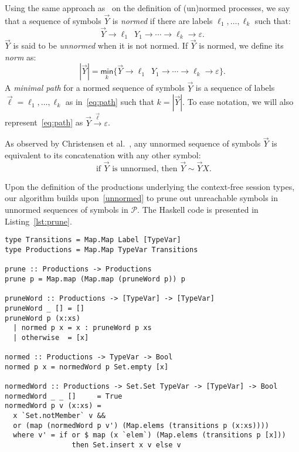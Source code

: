 Using the same approach as~\cite{DBLP:journals/iandc/ChristensenHS95} on 
the definition of (un)normed processes, we say that a sequence of symbols 
$\vec Y$ is \emph{normed} if there are labels $\ell_1,\ldots, \ell_k$ 
such that:
\begin{equation}
\label{eq:path}
	\vec Y \rightarrow \ell_1\enspace Y_1 \rightarrow \cdots \rightarrow \ell_k 
	\rightarrow \varepsilon.
\end{equation}
$\vec Y$ is said to be \emph{unnormed} when it is not normed. If $\vec Y$ 
is normed, we define its \emph{norm} as: 
\[ | \vec Y | = \underset{k}{\mathsf{min}} \{\vec Y \rightarrow \ell_1\enspace Y_1 
\rightarrow \cdots \rightarrow \ell_k \rightarrow \varepsilon \}.\]
A \emph{minimal path} for a normed sequence of symbols $\vec Y$ is a sequence of
labels $\vec \ell = \ell_1,\ldots,\ell_k$ as in~\eqref{eq:path} such that 
$k = | \vec Y |$. To ease notation, we will also represent~\eqref{eq:path} as
$\vec Y \xrightarrow{\vec \ell} \varepsilon$.


As observed by Christensen et al.~\cite{DBLP:journals/iandc/ChristensenHS95}, 
any unnormed sequence of symbols $\vec Y$ is equivalent to its concatenation 
with any other symbol:
\begin{equation}
\label{unnormed}
\text{ if } \vec Y \text{ is unnormed, then } \vec Y \sim \vec Y X.
\end{equation}

Upon the definition of the productions underlying the context-free session types,
our algorithm builds upon~\eqref{unnormed} to prune out unreachable symbols in
unnormed sequences of symbols in $\mathcal{P}$. The Haskell code 
is presented in Listing~\ref{lst:prune}.

\begin{lstlisting}[caption={Haskell code for the stage of pruning unnormed productions},label={lst:prune},captionpos=b]
type Transitions = Map.Map Label [TypeVar]
type Productions = Map.Map TypeVar Transitions

prune :: Productions -> Productions
prune p = Map.map (Map.map (pruneWord p)) p

pruneWord :: Productions -> [TypeVar] -> [TypeVar]
pruneWord _ [] = []
pruneWord p (x:xs)
  | normed p x = x : pruneWord p xs
  | otherwise  = [x]

normed :: Productions -> TypeVar -> Bool
normed p x = normedWord p Set.empty [x]

normedWord :: Productions -> Set.Set TypeVar -> [TypeVar] -> Bool
normedWord _ _ []     = True
normedWord p v (x:xs) =
  x `Set.notMember` v &&
  or (map (normedWord p v') (Map.elems (transitions p (x:xs))))
  where v' = if or $ map (x `elem`) (Map.elems (transitions p [x])) 
                then Set.insert x v else v
\end{lstlisting}

